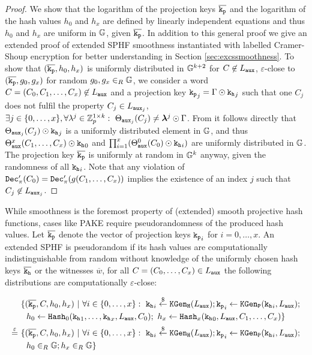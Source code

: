 \begin{proof}
We show that the logarithm of the projection keys $\overline{\mathtt{k_p}}$ and the logarithm of the hash values $h_0$ and $h_x$ are defined by linearly independent equations and thus $h_0$ and $h_x$ are uniform in $\mathbb{G}$, given $\overline{\mathtt{k_p}}$.
In addition to this general proof we give an extended proof of extended \ac{SPHF} smoothness instantiated with labelled Cramer-Shoup encryption for better understanding in Section \ref{sec:excssmoothness}.
To show that $(\overline{\mathtt{k_p}},h_0,h_x)$ is uniformly distributed in $\mathbb{G}^{k+2}$ for $C\not\in L_\mathtt{aux}$, \ie $\varepsilon$-close to $(\overline{\mathtt{k_p}},g_0,g_x)$ for random $g_0,g_x\in_R\mathbb{G}$, we consider a word $C=(C_0,C_1,\dots,C_x)\not\in L_\mathtt{aux}$ and a projection key $\mathtt{k_p}_j=\Gamma \odot \mathtt{k_h}_j$ such that one $C_j$ does not fulfil the property $C_j\in L_{\mathtt{aux}_j}$, \ie $\exists j\in\{0,\dots,x\},\forall\lambda^j\in\mathbb{Z}_p^{1\times k}:~\Theta_{\mathtt{aux}_j}(C_j)\not=\bm{\lambda}^j\odot \Gamma$.
From \cite[Appendix D.3]{cryptoeprint:2013:034} it follows directly that $\Theta_{\mathtt{aux}_j}(C_j)\odot\mathtt{k_h}_j$ is a uniformly distributed element in $\mathbb{G}$, and thus $\Theta^x_{\mathtt{aux}}(C_1,\dots,C_x)\odot\mathtt{k_h}_0$ and $\prod^{x}_{i=1}(\Theta_{\mathtt{aux}}^0(C_0)\odot\mathtt{k_h}_i)$ are uniformly distributed in $\mathbb{G}$.
The projection key $\overline{\mathtt{k_p}}$ is uniformly at random in $\mathbb{G}^{k}$ anyway, given the randomness of all $\mathtt{k_h}_i$.
Note that any violation of $\mathtt{Dec}'_{\pi}(C_0)=\mathtt{Dec}'_{\pi}(g(C_1,\dots,C_x))$ implies the existence of an index $j$ such that $C_j\not\in L_{\mathtt{aux}_j}$.
\end{proof}

\noindent
While smoothness is the foremost property of (extended) smooth projective hash functions, cases like \ac{PAKE} require pseudorandomness of the produced hash values.
Let $\overline{\mathtt{k_p}}$ denote the vector of projection keys $\mathtt{k_p}_i$ for $i=0,\dots,x$.
An extended \ac{SPHF} is pseudorandom if its hash values are computationally indistinguishable from random without knowledge of the uniformly chosen hash keys $\overline{\mathtt{k_h}}$ or the witnesses $\overline{w}$, \ie for all $C=(C_0,\dots,C_x)\in L_\mathtt{aux}$ the following distributions are computationally $\varepsilon$-close:

\begin{align*}
& \{(\overline{\mathtt{k_p}},C,h_0,h_x) ~|~ \forall i\in\{0,\dots,x\}:~ \mathtt{k_h}_i\stackrel{\$}{\gets}\mathtt{KGen_H}(L_\mathtt{aux}); \mathtt{k_p}_i\gets\mathtt{KGen_P}(\mathtt{k_h}_i,L_\mathtt{aux}); \\
& ~~h_0\gets\mathtt{Hash}_0(\mathtt{k_h}_1,\dots,\mathtt{k_h}_x,L_\mathtt{aux},C_0);~ h_x\gets\mathtt{Hash}_x(\mathtt{k_h}_0,L_\mathtt{aux},C_1,\dots,C_x)\} \\
\stackrel{\varepsilon}{=}~ & \{(\overline{\mathtt{k_p}},C,h_0,h_x) ~|~ \forall i\in\{0,\dots,x\}:~ \mathtt{k_h}_i\stackrel{\$}{\gets}\mathtt{KGen_H}(L_\mathtt{aux}); \mathtt{k_p}_i\gets\mathtt{KGen_P}(\mathtt{k_h}_i,L_\mathtt{aux}); \\
& ~~ h_0\in_R\mathbb{G}; h_x\in_R\mathbb{G}\}
\end{align*}

